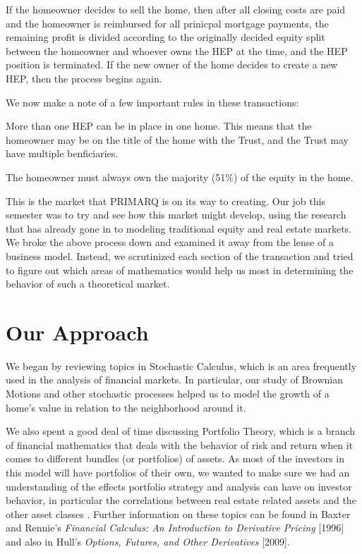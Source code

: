 \documentclass[twoside]{article}
\begin{document}
If the homeowner decides to sell the home, then after all closing costs are paid and the homeowner is reimbursed for all prinicpal mortgage payments, the remaining profit is divided according to the originally decided equity split between the homeowner and whoever owns the HEP at the time, and the HEP position is terminated. If the new owner of the home decides to create a new HEP, then the process begins again.  

We now make a note of a few important rules in these transactions:
\begin{compactitem}
\item {More than one HEP can be in place in one home. This means that the homeowner may be on the title of the home with the Trust, and the Trust may have multiple benficiaries.}
\item The homeowner must always own the majority (51\%) of the equity in the home.
\end{compactitem}

This is the market that PRIMARQ is on its way to creating. Our job this semester was to try and see how this market might develop, using the research that has already gone in to modeling traditional equity and real estate markets. We broke the above process down and examined it away from the lense of a business model. Instead, we scrutinized each section of the transaction and tried to figure out which areas of mathematics would help us most in determining the behavior of such a theoretical market. 

\section{Our Approach}

We began by reviewing topics in Stochastic Calculus, which is an area frequently used in the analysis of financial markets. In particular, our study of Brownian Motions and other stochastic processes helped us to model the growth of a home's value in relation to the neighborhood around it. 

We also spent a good deal of time discussing Portfolio Theory, which is a branch of financial mathematics that deals with the behavior of risk and return when it comes to different bundles (or portfolios) of assets. As most of the investors in this model will have portfolios of their own, we wanted to make sure we had an understanding of the effects portfolio strategy and analysis can have on investor behavior, in particular the correlations between real estate related assets and the other asset classes . Further information on these topics can be found in Baxter and Rennie's \textit{Financial Calculus: An Introduction to Derivative Pricing} [1996] and also in Hull's \textit{Options, Futures, and Other Derivatives} [2009].
\end{document}
